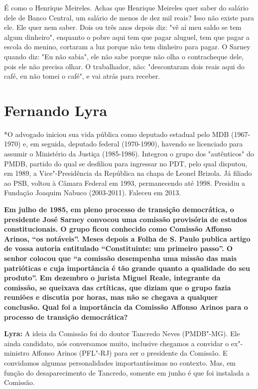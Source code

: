 É como o Henrique Meireles. Achas que Henrique Meireles quer saber do
salário dele de Banco Central, um salário de menos de dez mil reais?
Isso não existe para ele. Ele quer nem saber. Dois ou três anos depois
diz: "vê aí meu saldo se tem algum dinheiro", enquanto o pobre aqui tem
que pagar aluguel, tem que pagar a escola do menino, cortaram a luz
porque não tem dinheiro para pagar. O Sarney quando diz: "Eu não sabia",
ele não sabe porque não olha o contracheque dele, pois ele não precisa
olhar. O trabalhador, não: "descontaram dois reais aqui do café, eu não
tomei o café", e vai atrás para receber.

\section{Fernando Lyra}

*O advogado iniciou sua vida pública como deputado estadual pelo MDB
(1967-1970) e, em seguida, deputado federal (1970-1990), havendo se
licenciado para assumir o Ministério da Justiça (1985-1986). Integrou o
grupo dos "autênticos" do PMDB, partido do qual se desfiliou para
ingressar no PDT, pelo qual disputou, em 1989, a Vice"-Presidência da
República na chapa de Leonel Brizola. Já filiado ao PSB, voltou à Câmara
Federal em 1993, permanecendo até 1998. Presidiu a Fundação Joaquim
Nabuco (2003-2011). Faleceu em 2013.

\textbf{Em julho de 1985, em pleno processo de transição democrática, o
presidente José Sarney convocou uma comissão provisória de estudos
constitucionais. O grupo ficou conhecido como Comissão Affonso Arinos,
``os notáveis''. Meses depois a Folha de S. Paulo publica artigo de
vossa autoria entitulado ``Constituinte: um primeiro passo''. O senhor
colocou que ``a comissão desempenha uma missão das mais patrióticas e
cuja importância é tão grande quanto a qualidade do seu produto''. Em
dezembro o jurista Miguel Reale, integrante da comissão, se queixava das
crtíticas, que diziam que o grupo fazia reuniões e discutia por horas,
mas não se chegava a qualquer conclusão. Qual foi a importância da
Comissão Affonso Arinos para o processo de transição democrática?}

\textbf{Lyra:} A ideia da Comissão foi do doutor Tancredo Neves
(PMDB"-MG). Ele ainda candidato, nós conversamos muito, inclusive
chegamos a convidar o ex"-ministro Affonso Arinos (PFL"-RJ) para ser o
presidente da Comissão. E convidamos algumas personalidades
importantíssimas no contexto. Mas, em função do desaparecimento de
Tancredo, somente em junho é que foi instalada a Comissão.

